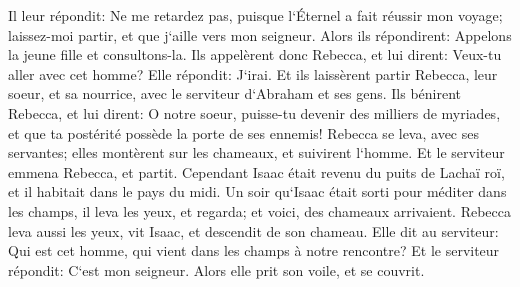 \verse Il leur répondit: Ne me retardez pas, puisque l`Éternel a fait réussir mon voyage; laissez-moi partir, et que j`aille vers mon seigneur. 
\verse Alors ils répondirent: Appelons la jeune fille et consultons-la. 
\verse Ils appelèrent donc Rebecca, et lui dirent: Veux-tu aller avec cet homme? Elle répondit: J`irai. 
\verse Et ils laissèrent partir Rebecca, leur soeur, et sa nourrice, avec le serviteur d`Abraham et ses gens. 
\verse Ils bénirent Rebecca, et lui dirent: O notre soeur, puisse-tu devenir des milliers de myriades, et que ta postérité possède la porte de ses ennemis! 
\verse Rebecca se leva, avec ses servantes; elles montèrent sur les chameaux, et suivirent l`homme. Et le serviteur emmena Rebecca, et partit. 
\verse Cependant Isaac était revenu du puits de Lachaï roï, et il habitait dans le pays du midi. 
\verse Un soir qu`Isaac était sorti pour méditer dans les champs, il leva les yeux, et regarda; et voici, des chameaux arrivaient. 
\verse Rebecca leva aussi les yeux, vit Isaac, et descendit de son chameau. 
\verse Elle dit au serviteur: Qui est cet homme, qui vient dans les champs à notre rencontre? Et le serviteur répondit: C`est mon seigneur. Alors elle prit son voile, et se couvrit. 
